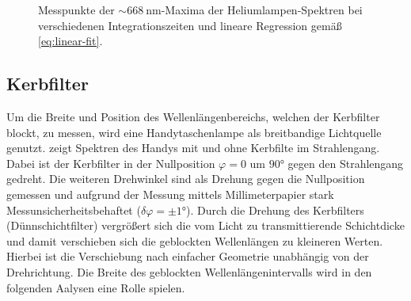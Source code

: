 \documentclass[../bericht.tex]{subfiles}
\begin{document}
        \begin{figure}
          \caption[Messpunkte der $\sim\SI{668}{\nano\meter}$-Maxima der Heliumlampen-Spektren bei verschiedenen Integrationszeiten (vgl. \cref{fig:linearity}) und lineare Regression.]{Messpunkte der $\sim\SI{668}{\nano\meter}$-Maxima der Heliumlampen-Spektren bei verschiedenen Integrationszeiten und lineare Regression gemäß \cref{eq:linear-fit}.}
          \label{fig:linearitaet}
        \end{figure}


      \subsection{Kerbfilter}
      \label{subsec:kerbfilter}

        Um die Breite und Position des Wellenlängenbereichs, welchen der Kerbfilter blockt, zu messen, wird eine Handytaschenlampe als breitbandige Lichtquelle genutzt.  zeigt Spektren des Handys mit und ohne Kerbfilte im Strahlengang. Dabei ist der Kerbfilter in der Nullposition $\varphi=0$ um $\ang{90}$ gegen den Strahlengang gedreht. Die weiteren Drehwinkel sind als Drehung gegen die Nullposition gemessen und aufgrund der Messung mittels Millimeterpapier stark Messunsicherheitsbehaftet ($\delta \varphi=\pm \ang{1}$). Durch die Drehung des Kerbfilters (Dünnschichtfilter) vergrößert sich die vom Licht zu transmittierende Schichtdicke und damit verschieben sich die geblockten Wellenlängen zu kleineren Werten. Hierbei ist die Verschiebung nach einfacher Geometrie unabhängig von der Drehrichtung. Die Breite des geblockten Wellenlängenintervalls wird in den folgenden Aalysen eine Rolle spielen.
\end{document}
